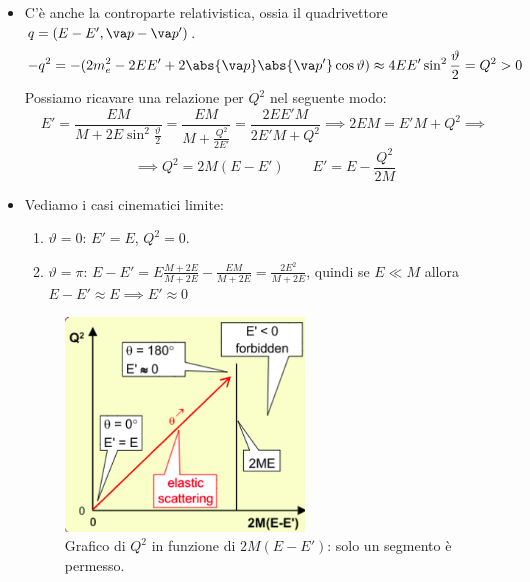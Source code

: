 \begin{itemize}
    \item C'è anche la controparte relativistica, ossia il quadrivettore $q=(E-E',\va p-\va p')$. 
    \begin{equation*}
    -q^2=-(2m_e^2-2EE'+2\abs{\va p}\abs{\va p'}\cos\vartheta)\approx4EE'\sin^2\frac\vartheta2=Q^2>0
    \end{equation*}
    Possiamo ricavare una relazione per $Q^2$ nel seguente modo:
    \begin{equation*}
        E'=\frac{EM}{M+2E\sin^2\frac\vartheta2}=\frac{EM}{M+\frac{Q^2}{2E'}}=\frac{2EE'M}{2E'M+Q^2}\implies 2EM=E'M+Q^2\implies
    \end{equation*}
    \begin{equation*}
        \implies Q^2=2M(E-E')\qquad E'=E-\frac{Q^2}{2M}
    \end{equation*}
    \item Vediamo i casi cinematici limite:
    \begin{enumerate}
        \item $\vartheta=0$: $E'=E$, $Q^2=0$.
        \item $\vartheta=\pi$: $E-E'=E\frac{M+2E}{M+2E}-\frac{EM}{M+2E}=\frac{2E^2}{M+2E}$, quindi se $E\ll M$ allora $E-E'\approx E\implies E'\approx0$ 
    \end{enumerate}
    \begin{figure}[H]
        \centering
        \includegraphics[width=0.6\textwidth]{immagini/fig_q_2_elastic.png}
        \caption{Grafico di $Q^2$ in funzione di $2M(E-E')$: solo un segmento è permesso.}
    \end{figure}
\end{itemize}

